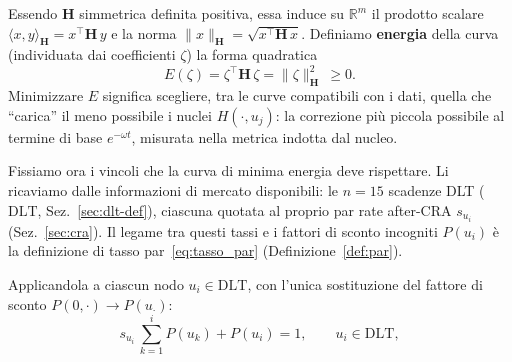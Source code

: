 \documentclass[11pt,a4paper]{article}
\theoremstyle{plain}
\theoremstyle{definition}
\theoremstyle{remark}
\newcommand{\DLT}{\mathrm{DLT}}
\newcommand{\Hmat}{\mathbf{H}}
\newcommand{\transp}{^{\!\top}}
\begin{document}
Essendo $\Hmat$ simmetrica definita positiva, essa induce su $\mathbb{R}^m$ il prodotto
scalare $\langle x,y\rangle_{\Hmat} = x\transp\Hmat\,y$ e la norma
$\|x\|_{\Hmat} = \sqrt{x\transp\Hmat\,x}$.
Definiamo \textbf{energia} della curva (individuata dai coefficienti $\zeta$) la forma quadratica
\[
  E(\zeta) = \zeta\transp \Hmat\, \zeta = \|\zeta\|_{\Hmat}^2 \ \ge 0 .
\]
Minimizzare $E$ significa scegliere, tra le curve compatibili con i dati, quella che ``carica''
il meno possibile i nuclei $H(\cdot,u_j)$: la correzione pi\`u piccola possibile al termine di
base $e^{-\omega t}$, misurata nella metrica indotta dal nucleo.


Fissiamo ora i vincoli che la curva di minima energia deve rispettare. Li ricaviamo dalle
informazioni di mercato disponibili: le $n=15$ scadenze DLT ($\DLT$, Sez.~\ref{sec:dlt-def}),
ciascuna quotata al proprio par rate after-CRA $s_{u_i}$ (Sez.~\ref{sec:cra}). Il legame tra
questi tassi e i fattori di sconto incogniti $P(u_i)$ \`e la definizione di tasso
par~\eqref{eq:tasso_par} (Definizione~\ref{def:par}).

Applicandola a ciascun nodo $u_i\in\DLT$, con l'unica sostituzione del fattore di sconto
$P(0,\cdot)\to P(u_\cdot)$:
\begin{equation}
  s_{u_i}\,\sum_{k=1}^{i} P(u_k) + P(u_i) = 1, \qquad u_i\in\DLT,
\end{equation}
\end{document}
